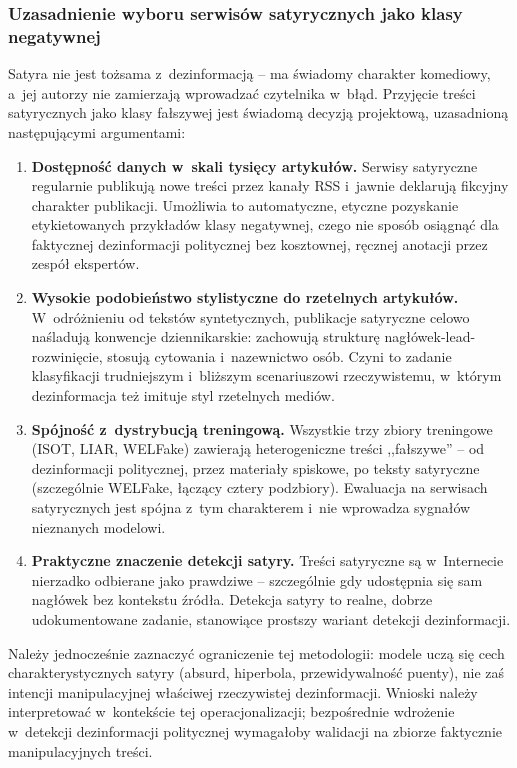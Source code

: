 \documentclass[oneside,polski,logo]{amuthesis}
\begin{document}
\subsubsection*{Uzasadnienie wyboru serwisów satyrycznych jako klasy negatywnej}

Satyra nie jest tożsama z~dezinformacją -- ma świadomy charakter komediowy,
a~jej autorzy nie zamierzają wprowadzać czytelnika w~błąd. Przyjęcie
treści satyrycznych jako klasy fałszywej jest świadomą decyzją projektową,
uzasadnioną następującymi argumentami:

\begin{enumerate}
  \item \textbf{Dostępność danych w~skali tysięcy artykułów.}
        Serwisy satyryczne regularnie publikują nowe treści przez kanały
        RSS i~jawnie deklarują fikcyjny charakter publikacji. Umożliwia
        to automatyczne, etyczne pozyskanie etykietowanych przykładów
        klasy negatywnej, czego nie sposób osiągnąć dla faktycznej
        dezinformacji politycznej bez kosztownej, ręcznej anotacji przez
        zespół ekspertów.
  \item \textbf{Wysokie podobieństwo stylistyczne do rzetelnych artykułów.}
        W~odróżnieniu od tekstów syntetycznych, publikacje satyryczne
        celowo naśladują konwencje dziennikarskie: zachowują strukturę
        nagłówek-lead-rozwinięcie, stosują cytowania i~nazewnictwo osób.
        Czyni to zadanie klasyfikacji trudniejszym i~bliższym scenariuszowi
        rzeczywistemu, w~którym dezinformacja też imituje styl rzetelnych mediów.
  \item \textbf{Spójność z~dystrybucją treningową.} Wszystkie trzy zbiory
        treningowe (ISOT, LIAR, WELFake) zawierają heterogeniczne treści
        ,,fałszywe'' -- od dezinformacji politycznej, przez materiały
        spiskowe, po teksty satyryczne (szczególnie WELFake, łączący cztery
        podzbiory). Ewaluacja na serwisach satyrycznych jest spójna
        z~tym charakterem i~nie wprowadza sygnałów nieznanych modelowi.
  \item \textbf{Praktyczne znaczenie detekcji satyry.} Treści satyryczne
        są w~Internecie nierzadko odbierane jako prawdziwe -- szczególnie
        gdy udostępnia się sam nagłówek bez kontekstu źródła. Detekcja
        satyry to realne, dobrze udokumentowane zadanie, stanowiące
        prostszy wariant detekcji dezinformacji.
\end{enumerate}

Należy jednocześnie zaznaczyć ograniczenie tej metodologii: modele
uczą się cech charakterystycznych satyry (absurd, hiperbola,
przewidywalność puenty), nie zaś intencji manipulacyjnej właściwej
rzeczywistej dezinformacji. Wnioski należy interpretować w~kontekście
tej operacjonalizacji; bezpośrednie wdrożenie w~detekcji dezinformacji
politycznej wymagałoby walidacji na zbiorze faktycznie manipulacyjnych treści.
\end{document}
